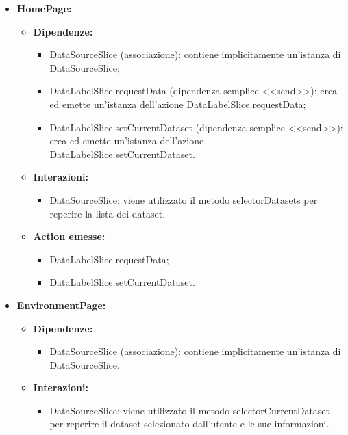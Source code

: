 \begin{itemize}
    \item \textbf{HomePage:}
    \begin{itemize}
        \item \textbf{Dipendenze:}
        \begin{itemize}
            \item DataSourceSlice (associazione): contiene implicitamente un'istanza di DataSourceSlice;
            \item DataLabelSlice.requestData (dipendenza semplice <<send>>): crea ed emette un’istanza dell’azione DataLabelSlice.requestData;
            \item DataLabelSlice.setCurrentDataset (dipendenza semplice <<send>>): crea ed emette un’istanza dell’azione DataLabelSlice.setCurrentDataset.
        \end{itemize} 
        \item \textbf{Interazioni:}
        \begin{itemize}
            \item DataSourceSlice: viene utilizzato il metodo selectorDatasets per reperire la lista dei dataset.
        \end{itemize} 
        \item \textbf{Action emesse:}
        \begin{itemize}
            \item DataLabelSlice.requestData;
            \item DataLabelSlice.setCurrentDataset.
        \end{itemize} 
    \end{itemize}

    \item \textbf{EnvironmentPage:}
    \begin{itemize}
        \item \textbf{Dipendenze:}
        \begin{itemize}
            \item DataSourceSlice (associazione): contiene implicitamente un'istanza di DataSourceSlice.
        \end{itemize} 
        \item \textbf{Interazioni:}
        \begin{itemize}
            \item DataSourceSlice: viene utilizzato il metodo selectorCurrentDataset per reperire il dataset selezionato dall'utente e le sue informazioni.
        \end{itemize}  
    \end{itemize}
\end{itemize}

